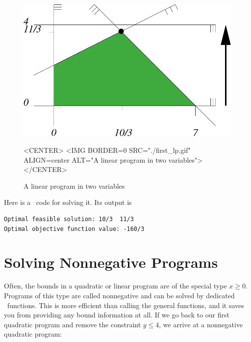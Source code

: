 \begin{figure}[htbp]
\begin{ccTexOnly}
\begin{center}
\includegraphics{QP_solver/first_lp} %
\end{center}
\end{ccTexOnly}
\caption{A linear program in two variables
\label{fig:QP-first_lp}}

\begin{ccHtmlOnly}
<CENTER>
<IMG BORDER=0 SRC="./first_lp.gif" ALIGN=center ALT="A linear program in two variables">
</CENTER>
\end{ccHtmlOnly}
\end{figure}

Here is a \cgal\ code for solving it. Its output is
\begin{verbatim}
Optimal feasible solution: 10/3  11/3
Optimal objective function value: -160/3
\end{verbatim}


\section{Solving Nonnegative Programs}\label{sec:QP-nonnegative}

Often, the bounds in a quadratic or linear program are of the special
type $x\geq 0$. Programs of this type are called nonnegative and
can be solved by dedicated \cgal\ functions. This is more efficient than
calling the general functions, and it saves you from providing any bound
information at all. If we go back to our first quadratic program and
remove the constraint $y\leq 4$, we arrive at a nonnegative quadratic
program: 

